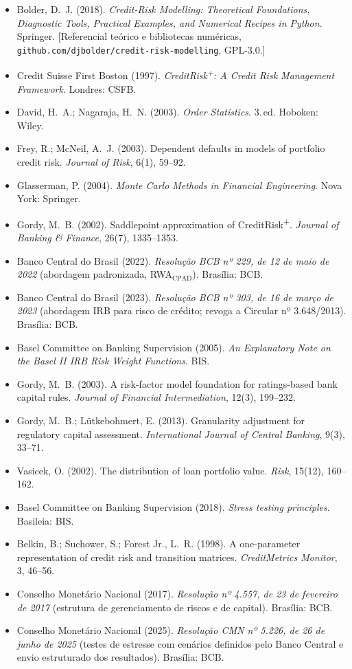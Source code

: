 \documentclass[11pt,a4paper]{article}
\begin{document}
\begin{itemize}\setlength\itemsep{1pt}
\item[] Bolder, D.~J. (2018). \emph{Credit-Risk Modelling: Theoretical Foundations, Diagnostic Tools, Practical Examples, and Numerical Recipes in Python}. Springer. [Referencial teórico e bibliotecas numéricas, \texttt{github.com/djbolder/credit-risk-modelling}, GPL-3.0.]
\item[] Credit Suisse First Boston (1997). \emph{CreditRisk\textsuperscript{+}: A Credit Risk Management Framework}. Londres: CSFB.
\item[] David, H.~A.; Nagaraja, H.~N. (2003). \emph{Order Statistics}. 3.\,ed. Hoboken: Wiley.
\item[] Frey, R.; McNeil, A.~J. (2003). Dependent defaults in models of portfolio credit risk. \emph{Journal of Risk}, 6(1), 59--92.
\item[] Glasserman, P. (2004). \emph{Monte Carlo Methods in Financial Engineering}. Nova York: Springer.
\item[] Gordy, M.~B. (2002). Saddlepoint approximation of CreditRisk\textsuperscript{+}. \emph{Journal of Banking \& Finance}, 26(7), 1335--1353.
\item[] Banco Central do Brasil (2022). \emph{Resolução BCB nº 229, de 12 de maio de 2022} (abordagem padronizada, RWA$_{\mathrm{CPAD}}$). Brasília: BCB.
\item[] Banco Central do Brasil (2023). \emph{Resolução BCB nº 303, de 16 de março de 2023} (abordagem IRB para risco de crédito; revoga a Circular nº 3.648/2013). Brasília: BCB.
\item[] Basel Committee on Banking Supervision (2005). \emph{An Explanatory Note on the Basel II IRB Risk Weight Functions}. BIS.
\item[] Gordy, M.~B. (2003). A risk-factor model foundation for ratings-based bank capital rules. \emph{Journal of Financial Intermediation}, 12(3), 199--232.
\item[] Gordy, M.~B.; Lütkebohmert, E. (2013). Granularity adjustment for regulatory capital assessment. \emph{International Journal of Central Banking}, 9(3), 33--71.
\item[] Vasicek, O. (2002). The distribution of loan portfolio value. \emph{Risk}, 15(12), 160--162.
\item[] Basel Committee on Banking Supervision (2018). \emph{Stress testing principles}. Basileia: BIS.
\item[] Belkin, B.; Suchower, S.; Forest Jr., L.~R. (1998). A one-parameter representation of credit risk and transition matrices. \emph{CreditMetrics Monitor}, 3, 46--56.
\item[] Conselho Monetário Nacional (2017). \emph{Resolução nº 4.557, de 23 de fevereiro de 2017} (estrutura de gerenciamento de riscos e de capital). Brasília: BCB.
\item[] Conselho Monetário Nacional (2025). \emph{Resolução CMN nº 5.226, de 26 de junho de 2025} (testes de estresse com cenários definidos pelo Banco Central e envio estruturado dos resultados). Brasília: BCB.
\end{itemize}
\end{document}
